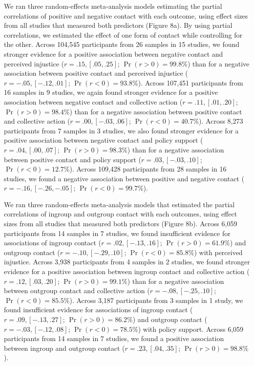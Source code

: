 \documentclass[twocolumn, 11pt, letterpaper]{article}
\begin{document}
We ran three random-effects meta-analysis models estimating the partial
correlations of positive and negative contact with each outcome, using
effect sizes from all studies that measured both predictors (Figure 8a).
By using partial correlations, we estimated the effect of one form of
contact while controlling for the other. Across 104,545 participants
from 26 samples in 15 studies, we found stronger evidence for a positive
association between negative contact and perceived injustice
(\(r = .15, [.05, .25]\); \(\Pr (r > 0) = 99.8\%\)) than for a negative
association between positive contact and perceived injustice
(\(r = -.05, [-.12, .01]\); \(\Pr (r < 0) = 93.8\%\)). Across 107,451
participants from 16 samples in 9 studies, we again found stronger
evidence for a positive association between negative contact and
collective action (\(r = .11, [.01, .20]\); \(\Pr (r > 0) = 98.4\%\))
than for a negative association between positive contact and collective
action (\(r = .00, [-.03, .06]\); \(\Pr (r < 0) = 40.7\%\)). Across
8,273 participants from 7 samples in 3 studies, we also found stronger
evidence for a positive association between negative contact and policy
support (\(r = .04, [.00, .07]\); \(\Pr (r > 0) = 98.3\%\)) than for a
negative association between positive contact and policy support
(\(r = .03, [-.03, .10]\); \(\Pr (r < 0) = 12.7\%\)). Across 109,428
participants from 28 samples in 16 studies, we found a negative
association between positive and negative contact
(\(r = -.16, [-.26, -.05]\); \(\Pr (r < 0) = 99.7\%\)).

We ran three random-effects meta-analysis models that estimated the
partial correlations of ingroup and outgroup contact with each outcomes,
using effect sizes from all studies that measured both predictors
(Figure 8b). Across 6,059 participants from 14 samples in 7 studies, we
found insufficient evidence for associations of ingroup contact
(\(r = .02, [-.13, .16]\); \(\Pr (r > 0) = 61.9\%\)) and outgroup
contact (\(r = -.10, [-.29, .10]\); \(\Pr (r < 0) = 85.8\%\)) with
perceived injustice. Across 3,938 participants from 4 samples in 2
studies, we found stronger evidence for a positive association between
ingroup contact and collective action (\(r = .12, [.03, .20]\);
\(\Pr (r > 0) = 99.1\%\)) than for a negative association between
outgroup contact and collective action (\(r = -.08, [-.25, .10]\);
\(\Pr (r < 0) = 85.5\%\)). Across 3,187 participants from 3 samples in 1
study, we found insufficient evidence for associations of ingroup
contact (\(r = .09, [-.13, .27]\); \(\Pr (r > 0) = 86.2\%\)) and
outgroup contact (\(r = -.03, [-.12, .08]\); \(\Pr (r < 0) = 78.5\%\))
with policy support. Across 6,059 participants from 14 samples in 7
studies, we found a positive association between ingroup and outgroup
contact (\(r = .23, [.04, .35]\); \(\Pr (r > 0) = 98.8\%\)).
\end{document}
